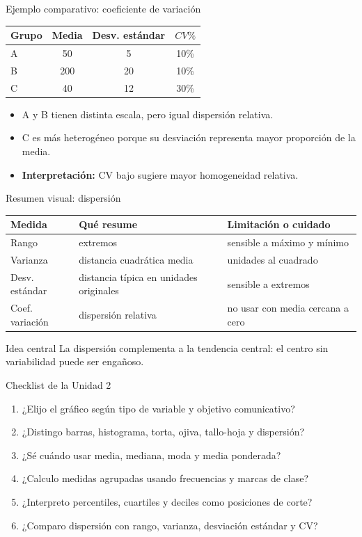 \documentclass[aspectratio=169,11pt]{beamer}
\begin{document}
\begin{frame}{Ejemplo comparativo: coeficiente de variación}
\begin{center}
\begin{tabular}{lccc}
\toprule
Grupo & Media & Desv. estándar & $CV\%$ \\
\midrule
A & 50 & 5 & 10\% \\
B & 200 & 20 & 10\% \\
C & 40 & 12 & 30\% \\
\bottomrule
\end{tabular}
\end{center}
\begin{itemize}
  \item A y B tienen distinta escala, pero igual dispersión relativa.
  \item C es más heterogéneo porque su desviación representa mayor proporción de la media.
  \item \textbf{Interpretación:} CV bajo sugiere mayor homogeneidad relativa.
\end{itemize}
\end{frame}

\begin{frame}{Resumen visual: dispersión}
\small
\begin{tabular}{p{}p{}p{}}
\toprule
Medida & Qué resume & Limitación o cuidado \\
\midrule
Rango & extremos & sensible a máximo y mínimo \\
Varianza & distancia cuadrática media & unidades al cuadrado \\
Desv. estándar & distancia típica en unidades originales & sensible a extremos \\
Coef. variación & dispersión relativa & no usar con media cercana a cero \\
\bottomrule
\end{tabular}
\vspace{0.7em}
\begin{block}{Idea central}
La dispersión complementa a la tendencia central: el centro sin variabilidad puede ser engañoso.
\end{block}
\end{frame}

\begin{frame}{Checklist de la Unidad 2}
\begin{enumerate}
  \item ¿Elijo el gráfico según tipo de variable y objetivo comunicativo?
  \item ¿Distingo barras, histograma, torta, ojiva, tallo-hoja y dispersión?
  \item ¿Sé cuándo usar media, mediana, moda y media ponderada?
  \item ¿Calculo medidas agrupadas usando frecuencias y marcas de clase?
  \item ¿Interpreto percentiles, cuartiles y deciles como posiciones de corte?
  \item ¿Comparo dispersión con rango, varianza, desviación estándar y CV?
\end{enumerate}
\end{frame}
\end{document}
